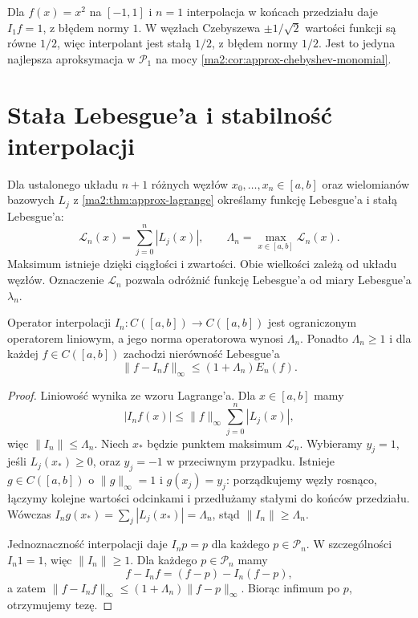 \begin{przyklad}
\label{ma2:ex:approx-interpolation-difference}
Dla $f(x)=x^2$ na $[-1,1]$ i $n=1$
interpolacja w końcach przedziału daje
$I_1f=1$, z błędem normy $1$.
W węzłach Czebyszewa $\pm1/\sqrt2$
wartości funkcji są równe $1/2$,
więc interpolant jest stałą $1/2$,
z błędem normy $1/2$.
Jest to jedyna najlepsza aproksymacja
w $\mathcal P_1$ na mocy
\ref{ma2:cor:approx-chebyshev-monomial}.
\end{przyklad}

\section{Stała Lebesgue'a i stabilność interpolacji}

\begin{definicja}
\label{ma2:def:approx-lebesgue-constant}
Dla ustalonego układu $n+1$ różnych węzłów
$x_0,\ldots,x_n\in[a,b]$ oraz wielomianów
bazowych $L_j$ z \ref{ma2:thm:approx-lagrange}
określamy funkcję Lebesgue'a i stałą Lebesgue'a:
\[
 \mathcal L_n(x)=\sum_{j=0}^n|L_j(x)|,\qquad
 \Lambda_n=\max_{x\in[a,b]}\mathcal L_n(x).
\]
Maksimum istnieje dzięki ciągłości i zwartości.
Obie wielkości zależą od układu węzłów.
Oznaczenie $\mathcal L_n$ pozwala odróżnić
funkcję Lebesgue'a od miary Lebesgue'a $\lambda_n$.
\end{definicja}

\begin{twierdzenie}
\label{ma2:thm:approx-lebesgue-norm}
Operator interpolacji $I_n:C([a,b])\to C([a,b])$
jest ograniczonym operatorem liniowym,
a jego norma operatorowa wynosi $\Lambda_n$.
Ponadto $\Lambda_n\ge1$ i dla każdej
$f\in C([a,b])$ zachodzi nierówność Lebesgue'a
\[
 \|f-I_nf\|_\infty\le(1+\Lambda_n)E_n(f).
\]
\end{twierdzenie}
\begin{proof}
Liniowość wynika ze wzoru Lagrange'a.
Dla $x\in[a,b]$ mamy
\[
 |I_nf(x)|\le \|f\|_\infty
                    \sum_{j=0}^n|L_j(x)|,
\]
więc $\|I_n\|\le\Lambda_n$.
Niech $x_*$ będzie punktem maksimum
$\mathcal L_n$. Wybieramy $y_j=1$, jeśli
$L_j(x_*)\ge0$, oraz $y_j=-1$ w przeciwnym
przypadku. Istnieje $g\in C([a,b])$ o
$\|g\|_\infty=1$ i $g(x_j)=y_j$:
porządkujemy węzły rosnąco, łączymy
kolejne wartości odcinkami i przedłużamy
stałymi do końców przedziału.
Wówczas $I_ng(x_*)=\sum_j|L_j(x_*)|=\Lambda_n$,
stąd $\|I_n\|\ge\Lambda_n$.

Jednoznaczność interpolacji daje $I_np=p$
dla każdego $p\in\mathcal P_n$.
W szczególności $I_n1=1$, więc
$\|I_n\|\ge1$. Dla każdego $p\in\mathcal P_n$
mamy
\[
 f-I_nf=(f-p)-I_n(f-p),
\]
a zatem $\|f-I_nf\|_\infty
\le(1+\Lambda_n)\|f-p\|_\infty$.
Biorąc infimum po $p$, otrzymujemy tezę.
\end{proof}

